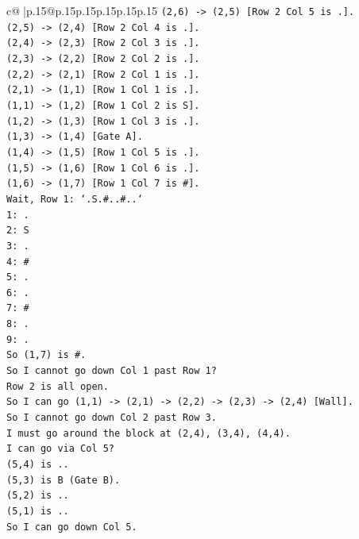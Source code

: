 \documentclass{article}
\begin{document}
{\begin{supertabular}{c@{$\;$}|p{.15\linewidth}@{}p{.15\linewidth}p{.15\linewidth}p{.15\linewidth}p{.15\linewidth}p{.15\linewidth}}
{{{\texttt{(2,6) {-}> (2,5) {[}Row 2 Col 5 is .{]}.} \\
\texttt{(2,5) {-}> (2,4) {[}Row 2 Col 4 is .{]}.} \\
\texttt{(2,4) {-}> (2,3) {[}Row 2 Col 3 is .{]}.} \\
\texttt{(2,3) {-}> (2,2) {[}Row 2 Col 2 is .{]}.} \\
\texttt{(2,2) {-}> (2,1) {[}Row 2 Col 1 is .{]}.} \\
\texttt{(2,1) {-}> (1,1) {[}Row 1 Col 1 is .{]}.} \\
\texttt{(1,1) {-}> (1,2) {[}Row 1 Col 2 is S{]}.} \\
\texttt{(1,2) {-}> (1,3) {[}Row 1 Col 3 is .{]}.} \\
\texttt{(1,3) {-}> (1,4) {[}Gate A{]}.} \\
\texttt{(1,4) {-}> (1,5) {[}Row 1 Col 5 is .{]}.} \\
\texttt{(1,5) {-}> (1,6) {[}Row 1 Col 6 is .{]}.} \\
\texttt{(1,6) {-}> (1,7) {[}Row 1 Col 7 is \#{]}.} \\
\texttt{Wait, Row 1: `.S.\#..\#..`} \\
\texttt{1: .} \\
\texttt{2: S} \\
\texttt{3: .} \\
\texttt{4: \#} \\
\texttt{5: .} \\
\texttt{6: .} \\
\texttt{7: \#} \\
\texttt{8: .} \\
\texttt{9: .} \\
\texttt{So (1,7) is \#.} \\
\texttt{So I cannot go down Col 1 past Row 1?} \\
\texttt{Row 2 is all open.} \\
\texttt{So I can go (1,1) {-}> (2,1) {-}> (2,2) {-}> (2,3) {-}> (2,4) {[}Wall{]}.} \\
\texttt{So I cannot go down Col 2 past Row 3.} \\
\texttt{I must go around the block at (2,4), (3,4), (4,4).} \\
\texttt{I can go via Col 5?} \\
\texttt{(5,4) is ..} \\
\texttt{(5,3) is B (Gate B).} \\
\texttt{(5,2) is ..} \\
\texttt{(5,1) is ..} \\
\texttt{So I can go down Col 5.} \\
}}}
\end{supertabular}}
\end{document}
